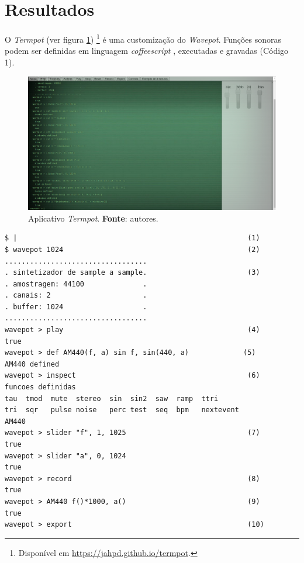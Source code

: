 \section{Resultados}\label{sec:termpot}

O \emph{Termpot} (ver figura \ref{fig:termpot}) \footnote{Disponível em \url{https://jahpd.github.io/termpot}.} é uma customização do \emph{Wavepot}. Funções sonoras podem ser definidas em linguagem \emph{coffeescript} \cite{burnham2011coffeescript}, executadas e gravadas (Código 1). %

\begin{figure}[!h]
\centering
\includegraphics[scale=0.3]{termpot.png}
\caption{Aplicativo \emph{Termpot}. \textbf{Fonte}: autores.}
\label{fig:termpot}
\end{figure}

\begin{listing}
\begin{verbatim}
$ |                                                       (1)
$ wavepot 1024                                            (2)
..................................
. sintetizador de sample a sample.                        (3) 
. amostragem: 44100              .
. canais: 2                      .
. buffer: 1024                   .
..................................
wavepot > play                                            (4)                             
true
wavepot > def AM440(f, a) sin f, sin(440, a)             (5)
AM440 defined
wavepot > inspect                                         (6)
funcoes definidas 
tau  tmod  mute  stereo  sin  sin2  saw  ramp  ttri
tri  sqr   pulse noise	 perc test  seq  bpm   nextevent
AM440
wavepot > slider "f", 1, 1025                             (7)
true
wavepot > slider "a", 0, 1024            
true
wavepot > record                                          (8)
true
wavepot > AM440 f()*1000, a()                             (9)
true
wavepot > export                                          (10)
\end{verbatim}
\tiny{\caption{Ptty aguardando dados de entrada do improvisador (1). \emph{Boot} do ambiente \emph{wavepot} com um buffer de 1024 amostras por ciclo de DSP (2). Informações diversas do sistema (3). Execução do DSP (4). Definição de uma função \emph{AM440} (5). Informações sobre as funções diponíveis (6). Definição de GUIs (7). Gravação em um arquivo de áudio (8). Execução da função \emph{AM440} com controles (9). Download da gravação (10)}}
\label{code:resultados}
\end{listing}

